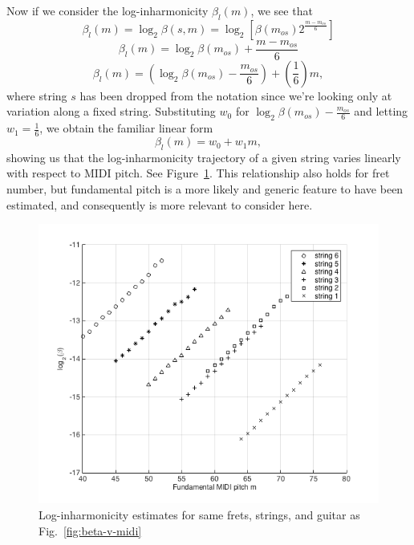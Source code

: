 \documentclass[12pt]{cmuthesis}
\begin{document}
Now if we consider the log-inharmonicity $\beta_{l}(m)$, we see that
\begin{equation}
\beta_l(m) = \log_2\beta(s,m) = \log_2[\beta(m_{os})2^{\frac{m-m_{os}}{6}}]
\end{equation}
\begin{equation}
\beta_l(m) = \log_2\beta(m_{os}) + \frac{m-m_{os}}{6}
\end{equation}
\begin{equation}
\beta_l(m) = (\log_2\beta(m_{os})-\frac{m_{os}}{6}) + (\frac{1}{6})m,
\end{equation}
where string $s$ has been dropped from the notation since we're looking only at variation along a fixed string. Substituting $w_0$ for $\log_2\beta(m_{os})-\frac{m_{os}}{6}$ and letting $w_1 = \frac{1}{6}$, we obtain the familiar linear form
\begin{equation}
\label{eq:linear-traj}
\beta_l(m) = w_0 + w_1m,
\end{equation}
showing us that the log-inharmonicity trajectory of a given string varies linearly with respect to MIDI pitch. See Figure~\ref{fig:log-beta-v-midi}. This relationship also holds for fret number, but fundamental pitch is a more likely and generic feature to have been estimated, and consequently is more relevant to consider here.

\begin{figure}[!htbp] 
\label{fig:log-beta-v-midi}
\centering
\includegraphics[scale=0.7]{log-beta-v-midi}
\caption{Log-inharmonicity estimates for same frets, strings, and guitar as Fig.~\ref{fig:beta-v-midi}}
\end{figure}
\end{document}
